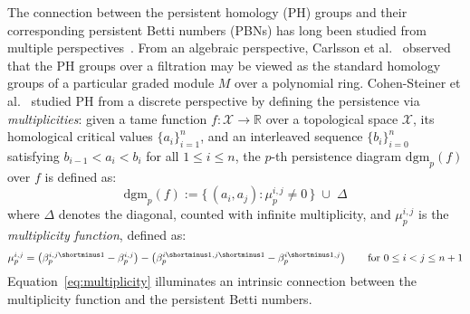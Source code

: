 
The connection between the persistent homology (PH) groups and their corresponding persistent Betti numbers (PBNs) has long been studied from multiple perspectives~\cite{cerri2013betti, chazal2016structure, cohen2005stability, zomorodian2004computing}.
From an algebraic perspective, Carlsson et al.~\cite{zomorodian2004computing} observed that the PH groups over a filtration may be viewed as the standard homology groups of a particular graded module $M$ over a polynomial ring. 
Cohen-Steiner et al.~\cite{cohen2005stability} studied PH from a discrete perspective by defining the persistence via \emph{multiplicities}: given a tame function $f: \mathcal{X} \to \mathbb{R}$ over a topological space $\mathcal{X}$, its homological critical values $\{ a_i \}_{i=1}^n$, and an interleaved sequence $\{ b_i \}_{i=0}^n$ satisfying $b_{i-1} < a_i < b_i$ for all $1 \leq i \leq n$, the $p$-th persistence diagram $\mathrm{dgm}_p(f)$ over $f$ is defined as: 
\begin{equation}\label{eq:dgm}
\mathrm{dgm}_p(f) := \{ \, (a_i, a_j) :  \mu_p^{i,j} \neq 0 \, \} \; \cup \; \Delta	
\end{equation}
where $\Delta$ denotes the diagonal, counted with infinite multiplicity, and $\mu_p^{i,j}$ is the  \emph{multiplicity function}, defined as: 
\begin{equation}\label{eq:multiplicity}
	\mu_p^{i,j} = \left(\beta_p^{i,j\shortminus1} - \beta_p^{i,j} \right) - \left(\beta_p^{i\shortminus1,j\shortminus1} - \beta_p^{i\shortminus1,j} \right) \quad\quad \text{for } 0 \leq i < j \leq n+ 1
\end{equation}
Equation~\eqref{eq:multiplicity} illuminates an intrinsic connection between the multiplicity function and the persistent Betti numbers. 
